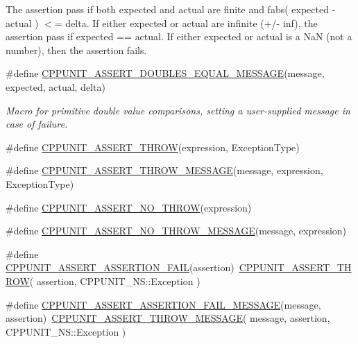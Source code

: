 \begin{DoxyCompactItemize}
\begin{DoxyCompactList}
The assertion pass if both expected and actual are finite and {\ttfamily fabs}( {\ttfamily expected} -\/ {\ttfamily actual} ) $<$= {\ttfamily delta}. If either {\ttfamily expected} or actual are infinite (+/-\/ inf), the assertion pass if {\ttfamily expected} == {\ttfamily actual}. If either {\ttfamily expected} or {\ttfamily actual} is a Na\+N (not a number), then the assertion fails. \end{DoxyCompactList}\item 
\#define \hyperlink{group___assertions_gaabb14685ed44e0e49e1974b460dfad1f}{C\+P\+P\+U\+N\+I\+T\+\_\+\+A\+S\+S\+E\+R\+T\+\_\+\+D\+O\+U\+B\+L\+E\+S\+\_\+\+E\+Q\+U\+A\+L\+\_\+\+M\+E\+S\+S\+A\+G\+E}(message, expected, actual, delta)
\begin{DoxyCompactList}\small\item\em Macro for primitive double value comparisons, setting a user-\/supplied message in case of failure. \end{DoxyCompactList}\item 
\#define \hyperlink{group___assertions_ga943774e85c218214d3a4986c32039af0}{C\+P\+P\+U\+N\+I\+T\+\_\+\+A\+S\+S\+E\+R\+T\+\_\+\+T\+H\+R\+O\+W}(expression, Exception\+Type)
\item 
\#define \hyperlink{group___assertions_gaae97b9355f43bb72ffa4489bd66dafb3}{C\+P\+P\+U\+N\+I\+T\+\_\+\+A\+S\+S\+E\+R\+T\+\_\+\+T\+H\+R\+O\+W\+\_\+\+M\+E\+S\+S\+A\+G\+E}(message, expression, Exception\+Type)
\item 
\#define \hyperlink{group___assertions_ga13e42eed1f56d77d9a76242185ebdcbe}{C\+P\+P\+U\+N\+I\+T\+\_\+\+A\+S\+S\+E\+R\+T\+\_\+\+N\+O\+\_\+\+T\+H\+R\+O\+W}(expression)
\item 
\#define \hyperlink{group___assertions_gaae2428381cbd7355b354473ebe2dc5ac}{C\+P\+P\+U\+N\+I\+T\+\_\+\+A\+S\+S\+E\+R\+T\+\_\+\+N\+O\+\_\+\+T\+H\+R\+O\+W\+\_\+\+M\+E\+S\+S\+A\+G\+E}(message, expression)
\item 
\#define \hyperlink{group___assertions_gafcf8b80f3af1607e52f41045ff0efbcb}{C\+P\+P\+U\+N\+I\+T\+\_\+\+A\+S\+S\+E\+R\+T\+\_\+\+A\+S\+S\+E\+R\+T\+I\+O\+N\+\_\+\+F\+A\+I\+L}(assertion)~\hyperlink{group___assertions_ga943774e85c218214d3a4986c32039af0}{C\+P\+P\+U\+N\+I\+T\+\_\+\+A\+S\+S\+E\+R\+T\+\_\+\+T\+H\+R\+O\+W}( assertion, C\+P\+P\+U\+N\+I\+T\+\_\+\+N\+S\+::\+Exception )
\item 
\#define \hyperlink{group___assertions_ga84c9c36cf203112a2b4a87cbb4b58f55}{C\+P\+P\+U\+N\+I\+T\+\_\+\+A\+S\+S\+E\+R\+T\+\_\+\+A\+S\+S\+E\+R\+T\+I\+O\+N\+\_\+\+F\+A\+I\+L\+\_\+\+M\+E\+S\+S\+A\+G\+E}(message, assertion)~\hyperlink{group___assertions_gaae97b9355f43bb72ffa4489bd66dafb3}{C\+P\+P\+U\+N\+I\+T\+\_\+\+A\+S\+S\+E\+R\+T\+\_\+\+T\+H\+R\+O\+W\+\_\+\+M\+E\+S\+S\+A\+G\+E}( message, assertion, C\+P\+P\+U\+N\+I\+T\+\_\+\+N\+S\+::\+Exception )

\end{DoxyCompactItemize}
